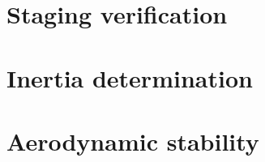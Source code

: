 \section{Staging verification}
\label{sec:staging_verification}


\section{Inertia determination}
\label{sec:inertia}


\section{Aerodynamic stability}
\label{sec:AerodynamicStability}
